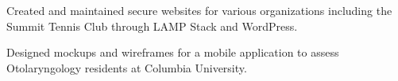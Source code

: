 \begin{cventries}
{\begin{cvitems}
             \vspace{1mm}
        \item {Created and maintained secure websites for various organizations including the Summit Tennis Club through LAMP Stack and WordPress.} 
             \vspace{1mm}
        \item {Designed mockups and wireframes for a mobile application to assess Otolaryngology residents at Columbia University.}
      \end{cvitems}
    }
    \vspace{-4.5mm}

    
\end{cventries}
